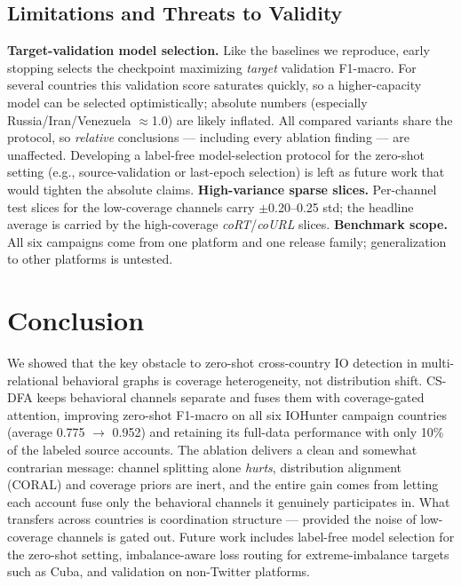 \documentclass[conference]{IEEEtran}
\newcommand{\method}{CS-DFA}
\begin{document}
\subsection{Limitations and Threats to Validity}
\label{sec:limitations}
\textbf{Target-validation model selection.} Like the baselines we reproduce,
early stopping selects the checkpoint maximizing \emph{target} validation
F1-macro. For several countries this validation score saturates quickly, so
a higher-capacity model can be selected optimistically; absolute numbers
(especially Russia/Iran/Venezuela $\approx$1.0) are likely inflated. All
compared variants share the protocol, so \emph{relative} conclusions ---
including every ablation finding --- are unaffected. Developing a label-free
model-selection protocol for the zero-shot setting (e.g., source-validation or
last-epoch selection) is left as future work that would tighten the absolute
claims.
\textbf{High-variance sparse slices.} Per-channel test slices for the
low-coverage channels carry $\pm$0.20--0.25 std; the headline average is
carried by the high-coverage \textit{coRT}/\textit{coURL} slices.
\textbf{Benchmark scope.} All six campaigns come from one platform and one
release family; generalization to other platforms is untested.

\section{Conclusion}

We showed that the key obstacle to zero-shot cross-country IO detection in
multi-relational behavioral graphs is coverage heterogeneity, not
distribution shift. \method{} keeps behavioral channels separate and fuses
them with coverage-gated attention, improving zero-shot F1-macro on all six
IOHunter campaign countries (average 0.775 $\rightarrow$ 0.952) and retaining
its full-data performance with only 10\% of the labeled source accounts. The
ablation delivers a clean and somewhat contrarian message: channel splitting
alone \emph{hurts}, distribution alignment (CORAL) and coverage priors are
inert, and the entire gain comes from letting each account fuse only the
behavioral channels it genuinely participates in. What transfers across
countries is coordination structure --- provided the noise of low-coverage
channels is gated out. Future work includes label-free model selection for
the zero-shot setting, imbalance-aware loss routing for extreme-imbalance
targets such as Cuba, and validation on non-Twitter platforms.
\end{document}
